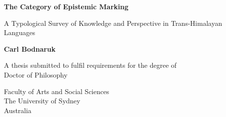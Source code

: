 \begin{titlepage}
    \begin{center}
        \vspace*{1cm}
            
        \Huge
        \textbf{The Category of Epistemic Marking}
        
        \LARGE
        A Typological Survey of Knowledge and Perspective in Trans-Himalayan Languages

            
        \vspace{0.5cm}

            
        \vspace{1.5cm}
            
        \textbf{Carl Bodnaruk}
            
        \vfill
            
        A thesis submitted to fulfil requirements for the degree of \\
        Doctor of Philosophy
            
        \vspace{2cm}
            
        \Large
        Faculty of Arts and Social Sciences\\
        The University of Sydney\\
        Australia\\
            
    \end{center}
\end{titlepage}